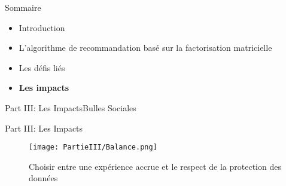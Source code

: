 \newcommand{\PartieIII}{Part III: Les Impacts}

\begin{frame}{Sommaire}
    \begin{itemize}
        \item Introduction
        \item L'algorithme de recommandation basé sur la factorisation matricielle
        \item Les défis liés
        \item \textbf{Les impacts}
    \end{itemize}
\end{frame}


\begin{frame}{\PartieIII}{Bulles Sociales}

    \begin{figure}
        \centering
        \quad \quad \quad
    \end{figure}

\end{frame}

\begin{frame}{\PartieIII}

    \begin{figure}
        \centering
        \texttt{[image: PartieIII/Balance.png]}
        \caption{Choisir entre une expérience accrue et le respect de la protection des données}
    \end{figure}

\end{frame}